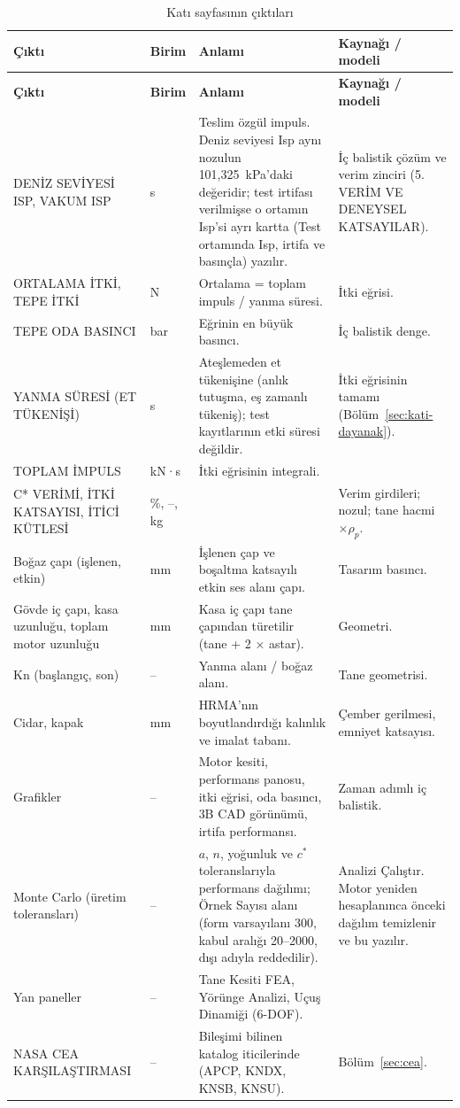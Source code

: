 \documentclass[11pt,a4paper]{article}
\newcommand{\ui}[1]{\textsf{#1}}
\begin{document}
\begin{longtable}{@{}>{\raggedright\arraybackslash}p{4.4cm}>{\raggedright\arraybackslash}p{1.3cm}>{\raggedright\arraybackslash}p{5.0cm}>{\raggedright\arraybackslash}p{4.9cm}@{}}
\caption{Katı sayfasının çıktıları}\label{tab:kati-cikti}\\
\toprule
\textbf{Çıktı} & \textbf{Birim} & \textbf{Anlamı} & \textbf{Kaynağı / modeli} \\
\midrule\endfirsthead
\toprule
\textbf{Çıktı} & \textbf{Birim} & \textbf{Anlamı} & \textbf{Kaynağı / modeli} \\
\midrule\endhead
\bottomrule\endlastfoot
\ui{DENİZ SEVİYESİ ISP}, \ui{VAKUM ISP} & s & Teslim özgül impuls. Deniz seviyesi Isp aynı nozulun 101,325~kPa'daki değeridir; test irtifası verilmişse o ortamın Isp'si ayrı kartta (\ui{Test ortamında Isp}, irtifa ve basınçla) yazılır. & İç balistik çözüm ve verim zinciri (\ui{5. VERİM VE DENEYSEL KATSAYILAR}). \\
\ui{ORTALAMA İTKİ}, \ui{TEPE İTKİ} & N & Ortalama = toplam impuls / yanma süresi. & İtki eğrisi. \\
\ui{TEPE ODA BASINCI} & bar & Eğrinin en büyük basıncı. & İç balistik denge. \\
\ui{YANMA SÜRESİ (ET TÜKENİŞİ)} & s & Ateşlemeden et tükenişine (anlık tutuşma, eş zamanlı tükeniş); test kayıtlarının etki süresi değildir. & İtki eğrisinin tamamı (Bölüm~\ref{sec:kati-dayanak}). \\
\ui{TOPLAM İMPULS} & kN·s & İtki eğrisinin integrali. & \\
\ui{C* VERİMİ}, \ui{İTKİ KATSAYISI}, \ui{İTİCİ KÜTLESİ} & \%, --, kg & & Verim girdileri; nozul; tane hacmi $\times\rho_p$. \\
Boğaz çapı (işlenen, etkin) & mm & İşlenen çap ve boşaltma katsayılı etkin ses alanı çapı. & Tasarım basıncı. \\
Gövde iç çapı, kasa uzunluğu, toplam motor uzunluğu & mm & Kasa iç çapı tane çapından türetilir (tane + 2 × astar). & Geometri. \\
Kn (başlangıç, son) & -- & Yanma alanı / boğaz alanı. & Tane geometrisi. \\
Cidar, kapak & mm & HRMA'nın boyutlandırdığı kalınlık ve imalat tabanı. & Çember gerilmesi, emniyet katsayısı. \\
Grafikler & -- & Motor kesiti, performans panosu, itki eğrisi, oda basıncı, 3B CAD görünümü, irtifa performansı. & Zaman adımlı iç balistik. \\
Monte Carlo (üretim toleransları) & -- & $a$, $n$, yoğunluk ve $c^*$ toleranslarıyla performans dağılımı; \ui{Örnek Sayısı} alanı (form varsayılanı 300, kabul aralığı 20--2000, dışı adıyla reddedilir). & \ui{Analizi Çalıştır}. Motor yeniden hesaplanınca önceki dağılım temizlenir ve bu yazılır. \\
Yan paneller & -- & Tane Kesiti FEA, Yörünge Analizi, Uçuş Dinamiği (6-DOF). & \\
\ui{NASA CEA KARŞILAŞTIRMASI} & -- & Bileşimi bilinen katalog iticilerinde (APCP, KNDX, KNSB, KNSU). & Bölüm~\ref{sec:cea}. \\
\end{longtable}
\end{document}
